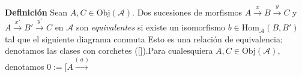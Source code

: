 \documentclass[preview]{standalone}
\begin{document}
\begin{center}
\justifying \textbf{Definición} Sean $A,C\in\text{Obj}(\mathscr{A})$. Dos sucesiones de morfismos $A\xrightarrow{x}B\xrightarrow{y}C$ y $A\xrightarrow{x'}B'\xrightarrow{y'}C$ en $\mathscr{A}$ son \emph{equivalentes} si existe un isomorfismo $b\in\text{Hom}_\mathscr{A}(B,B')$ tal que el siguiente diagrama conmuta \break \vspace{5mm}Esto es una relación de equivalencia; denotamos las clases con corchetes ([]).Para cualesquiera $A,C\in\text{Obj}(\mathscr{A})$, denotamos $0:= \big[ A \xrightarrow{\big(\begin{smallmatrix}a\end{smallmatrix}\big)}$
\end{center}
\end{document}
